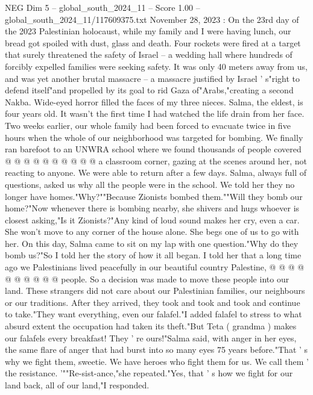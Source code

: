 \begin{textsample}{NEG Dim 5 – global\_south\_2024\_11 – Score 1.00 – global\_south\_2024\_11/117609375.txt}  \label{ex:f5_neg_425}
November 28, 2023 : On the 23rd day of the 2023 Palestinian holocaust, while my family and I were having lunch, our bread got spoiled with dust, glass and death.
Four rockets were fired at a target that surely threatened the safety of Israel -- a wedding hall where hundreds of forcibly expelled families were seeking safety.
It was only 40 meters away from us, and was yet another brutal massacre -- a massacre justified by Israel ' s"right to defend itself"and propelled by its goal to rid Gaza of"Arabs,"creating a second Nakba.
Wide-eyed horror filled the faces of my three nieces.
Salma, the eldest, is four years old.
It wasn't the first time I had watched the life drain from her face.
Two weeks earlier, our whole family had been forced to evacuate twice in five hours when the whole of our neighborhood was targeted for bombing.
We finally ran barefoot to an UNWRA school where we found thousands of people covered @ @ @ @ @ @ @ @ @ @ a classroom corner, gazing at the scenes around her, not reacting to anyone.
We were able to return after a few days.
Salma, always full of questions, asked us why all the people were in the school.
We told her they no longer have homes."Why?""Because Zionists bombed them.""Will they bomb our home?"Now whenever there is bombing nearby, she shivers and hugs whoever is closest asking,"Is it Zionists?"Any kind of loud sound makes her cry, even a car.
She won't move to any corner of the house alone.
She begs one of us to go with her.
On this day, Salma came to sit on my lap with one question."Why do they bomb us?"So I told her the story of how it all began.
I told her that a long time ago we Palestinians lived peacefully in our beautiful country Palestine, @ @ @ @ @ @ @ @ @ @ people.
So a decision was made to move these people into our land.
These strangers did not care about our Palestinian families, our neighbours or our traditions.
After they arrived, they took and took and took and continue to take."They want everything, even our falafel."I added falafel to stress to what absurd extent the occupation had taken its theft."But Teta ( grandma ) makes our falafels every breakfast!
They ' re ours!"Salma said, with anger in her eyes, the same flare of anger that had burst into so many eyes 75 years before."That ' s why we fight them, sweetie.
We have heroes who fight them for us.
We call them ' the resistance. '""Re-sist-ance,"she repeated."Yes, that ' s how we fight for our land back, all of our land,"I responded.

\end{textsample}
